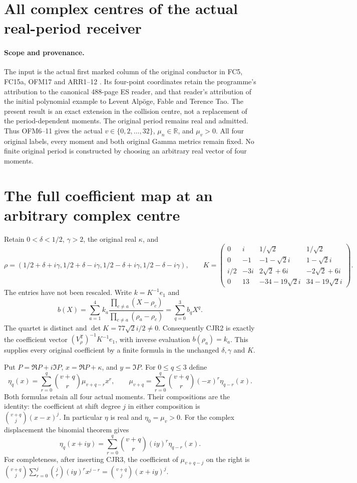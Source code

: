 \documentclass[11pt]{article}
\begin{document}
\section{All complex centres of the actual real-period receiver}


\paragraph{Scope and provenance.}
The input is the actual first marked column of the original conductor
in FC5, FC15a, OFM17 and ARR1--12 \cite{ES488,WCF}. Its four-point
coordinates retain the programme's attribution to the canonical
488-page ES reader, and that reader's attribution of the initial
polynomial example to Levent Alp\"oge, Fable and Terence Tao.
The present result is an exact extension in the collision centre,
not a replacement of the period-dependent moments. The original
period remains real and admitted. Thus OFM6--11 gives the actual
$v\in\{0,2,\ldots,32\}$, $\mu_n\in\mathbb R$, and $\mu_v>0$.
All four original labels, every moment and both original Gamma
metrics remain fixed. No finite original period is constructed
by choosing an arbitrary real vector of four moments.

\section{The full coefficient map at an arbitrary complex centre}
Retain $0<\delta<1/2$, $\gamma>2$, the original real $\kappa$, and
\[
 \rho=(1/2+\delta+i\gamma,1/2+\delta-i\gamma,
       1/2-\delta+i\gamma,1/2-\delta-i\gamma),\qquad
 K=\begin{pmatrix}
 0&i&1/\sqrt2&1/\sqrt2\\
 0&-1&-1-\sqrt2i&1-\sqrt2i\\
 i/2&-3i&2\sqrt2+6i&-2\sqrt2+6i\\
 0&13&-34-19\sqrt2i&34-19\sqrt2i
 \end{pmatrix}.
 \tag{CJR1}
\]
The entries have not been rescaled. Write $k=K^{-1}e_1$ and
\[
 b(X)=\sum_{a=1}^4k_a
 \frac{\prod_{c\ne a}(X-\rho_c)}{\prod_{c\ne a}(\rho_a-\rho_c)}
 =\sum_{q=0}^3b_qX^q.
 \tag{CJR2}
\]
The quartet is distinct and $\det K=77\sqrt2i/2\ne0$.
Consequently CJR2 is exactly the coefficient vector
$(V_\rho^{\mathsf T})^{-1}K^{-1}e_1$, with inverse evaluation
$b(\rho_a)=k_a$. This supplies every original coefficient by a
finite formula in the unchanged $\delta,\gamma$ and $K$.

Put $P=\Re P+i\Im P$, $x=\Re P+\kappa$, and $y=\Im P$.
For $0\le q\le3$ define
\[
 \eta_q(x)=\sum_{r=0}^q\binom{v+q}{r}\mu_{v+q-r}x^r,
 \qquad
 \mu_{v+q}=\sum_{r=0}^q\binom{v+q}{r}(-x)^r\eta_{q-r}(x).
 \tag{CJR3}
\]
Both formulas retain all four actual moments. Their compositions
are the identity: the coefficient at shift degree $j$ in either
composition is $\binom{v+q}{j}(x-x)^j$. In particular $\eta$ is
real and $\eta_0=\mu_v>0$.
For the complex displacement the binomial theorem gives
\[
 \eta_q(x+iy)=\sum_{r=0}^q\binom{v+q}{r}(iy)^r\eta_{q-r}(x).
 \tag{CJR4}
\]
For completeness, after inserting CJR3, the coefficient of
$\mu_{v+q-j}$ on the right is
$\binom{v+q}{j}\sum_{r=0}^j\binom jr(iy)^rx^{j-r}
=\binom{v+q}{j}(x+iy)^j$.
\end{document}
